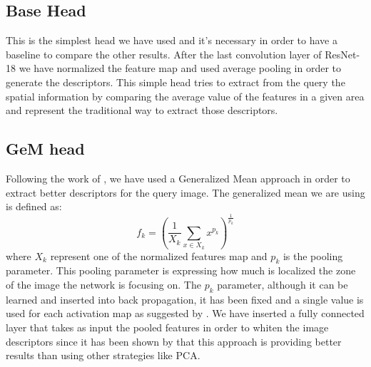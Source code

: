 \documentclass[10pt,twocolumn,letterpaper]{article}
\begin{document}
\subsection{Base Head}
This is the simplest head we have used and it's necessary in order to have a baseline to compare the other
results. After the last convolution layer of ResNet-18 we have normalized the feature map and used average 
pooling in order to generate the descriptors. This simple head tries to extract from the query the spatial
information by comparing the average value of the features in a given area and represent the traditional way 
to extract those descriptors.

\subsection{GeM head}
Following the work of \cite{GEM}, we have used a Generalized Mean approach in order to extract better 
descriptors for the query image. The generalized mean we are using is defined as:
\begin{equation}
   f_k = ({\frac{1}{X_k}} \sum_{x \in X_k} x^{p_k} ) ^ {\frac{1}{p_k}}
\end{equation}
where $X_k $ represent one of the normalized features map and $p_k $ is the pooling parameter. This 
pooling parameter is expressing how much is localized the zone of the image the network is focusing on.
The $p_k $ parameter, although it can be learned and inserted into back propagation, it has been fixed
and a single value is used for each activation map as suggested by \cite{GEM}. We have
inserted a fully connected layer that takes as input the pooled features in order to whiten the image
descriptors since it has been shown by \cite{GEM} that this approach is providing better results than
using other strategies like PCA.
\end{document}
